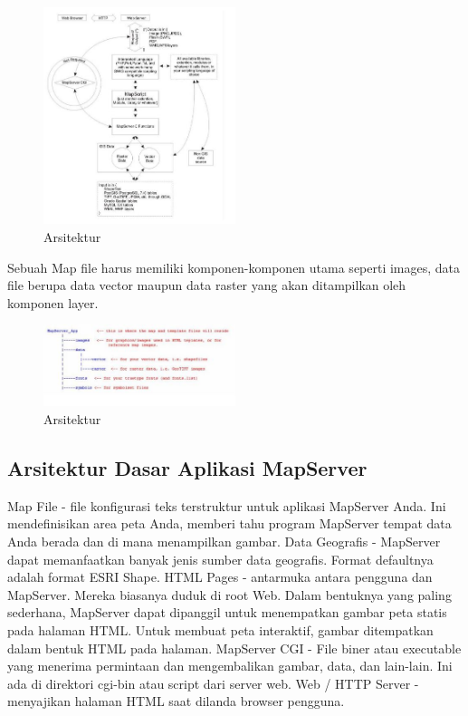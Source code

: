 \begin{figure}[ht]
	    \centerline{\includegraphics[width=0.50\textwidth]{figures/gambar7.JPG}}
	    \caption{Arsitektur}
		\label{gambar7}
		\end{figure}
		
Sebuah Map file harus memiliki komponen-komponen utama seperti images, data file berupa data vector maupun data raster yang akan ditampilkan oleh komponen layer.

\begin{figure}[ht]
	    \centerline{\includegraphics[width=0.50\textwidth]{figures/gambar8.JPG}}
	    \caption{Arsitektur}
		\label{gambar8}
		\end{figure}

\subsection{Arsitektur Dasar Aplikasi MapServer}
Map File - file konfigurasi teks terstruktur untuk aplikasi MapServer Anda. Ini mendefinisikan area peta Anda, memberi tahu program MapServer tempat data Anda berada dan di mana menampilkan gambar.
Data Geografis - MapServer dapat memanfaatkan banyak jenis sumber data geografis. Format defaultnya adalah format ESRI Shape.
HTML Pages - antarmuka antara pengguna dan MapServer. Mereka biasanya duduk di root Web. Dalam bentuknya yang paling sederhana, MapServer dapat dipanggil untuk menempatkan gambar peta statis pada halaman HTML. Untuk membuat peta interaktif, gambar ditempatkan dalam bentuk HTML pada halaman.
MapServer CGI - File biner atau executable yang menerima permintaan dan mengembalikan gambar, data, dan lain-lain. Ini ada di direktori cgi-bin atau script dari server web.
Web / HTTP Server - menyajikan halaman HTML saat dilanda browser pengguna.

